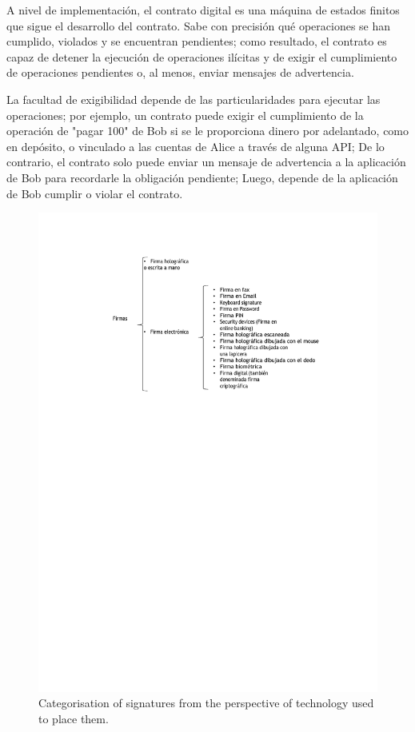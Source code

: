 \documentclass[12pt]{report} %
\begin{document}
    A nivel de implementación, el contrato digital es una máquina de estados finitos que sigue el desarrollo del contrato. Sabe con precisión qué operaciones se han cumplido, violados y se encuentran pendientes; como resultado, el contrato es capaz de detener la ejecución de operaciones ilícitas y de exigir el cumplimiento de operaciones pendientes o, al menos, enviar mensajes de advertencia.

    La facultad de exigibilidad depende de las particularidades para ejecutar las operaciones; por ejemplo, un contrato puede exigir el cumplimiento de la operación de "pagar 100" de Bob si se le proporciona dinero por adelantado, como en depósito, o vinculado a las cuentas de Alice a través de alguna API; De lo contrario, el contrato solo puede enviar un mensaje de advertencia a la aplicación de Bob para recordarle la obligación pendiente; Luego, depende de la aplicación de Bob cumplir o violar el contrato.

    



\begin{figure}
\centering
\includegraphics[width=0.85\columnwidth]{imagenes/cuadrollavefirmas.pdf}
\caption{Categorisation of signatures from the perspective of technology used to place them.}
\label{vusftollsbrgitmsd.pdf}
\end{figure} 
\end{document}
